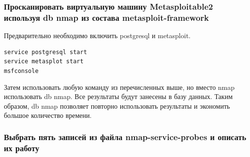 \documentclass[10pt,a4paper]{article}
\begin{document}
\subsubsection{Просканировать виртуальную машину Metasploitable2 используя db nmap из состава metasploit-framework}

Предварительно необходимо включить postgresql и metasploit.

\begin{verbatim}
service postgresql start
service metasplot start
msfconsole
\end{verbatim}

Затем использовать любую команду из перечисленных выше, но вместо nmap использовать db nmap. Все результаты будут занесены в базу данных. Таким образом, db nmap позволяет повторно использовать результаты и экономить большое количество времени.

\subsubsection{Выбрать пять записей из файла nmap-service-probes и описать их работу}
\end{document}
